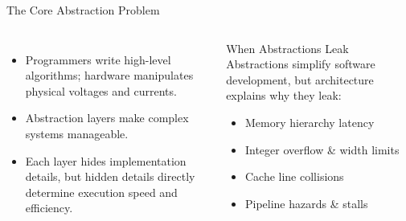 \documentclass[aspectratio=169,11pt]{beamer}
\begin{document}
\begin{frame}{The Core Abstraction Problem}

\begin{columns}[T,onlytextwidth]

\begin{itemize}
  \item Programmers write high-level algorithms; hardware manipulates physical voltages and currents.
  \item Abstraction layers make complex systems manageable.
  \item Each layer hides implementation details, but hidden details directly determine execution speed and efficiency.
\end{itemize}

\begin{block}{When Abstractions Leak}
Abstractions simplify software development, but architecture explains why they leak:
\begin{itemize}
  \item Memory hierarchy latency
  \item Integer overflow \& width limits
  \item Cache line collisions
  \item Pipeline hazards \& stalls
\end{itemize}
\end{block}

\end{columns}

\end{frame}

\end{document}
